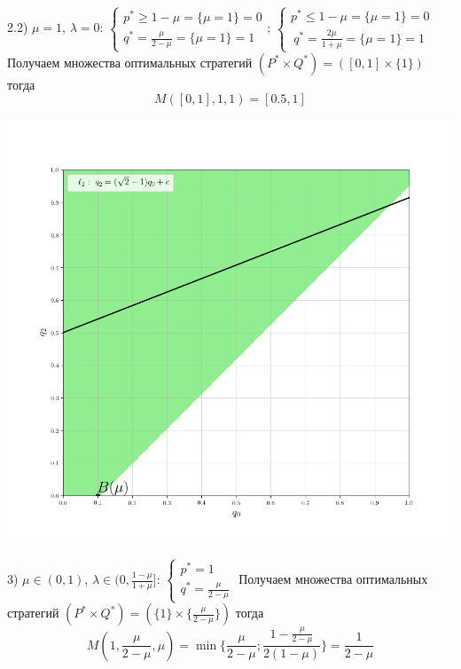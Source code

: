 \documentclass[letterpaper,12pt, reqno]{article}
\begin{document}
\begin{flushleft}
2.2) $\mu=1$, $\lambda=0$: 
$\begin{cases}p^{*} \geq 1-\mu = \{\mu=1\}=0
\\ q^{*}=\frac{\mu}{2-\mu} = \{\mu=1\}=1
\end{cases}$;
$\begin{cases}p^{*} \leq 1-\mu = \{\mu=1\}=0\\\
q^{*}=\frac{2\mu}{1+\mu}= \{\mu=1\}=1 \end{cases}$
\hfill \break 
Получаем множества оптимальных стратегий 
$(P^{*} \times Q^{*}) =([0, 1] \times \{1\})$ тогда
$$M([0, 1],1,1)=[0.5,1]$$

\begin{center}
\includegraphics[scale=0.6]{graf_3_3}
\end{center}
3) $\mu \in (0,1)$, $\lambda\in(0,\frac{1-\mu}{1+\mu}]$: 
$\begin{cases}p^{*}=1 \\ q^{*}=\frac{\mu}{2-\mu} \end{cases}$
\hfill \break
Получаем множества оптимальных стратегий 
$(P^{*} \times Q^{*}) =(\{1\} \times \{\frac{\mu}{2-\mu}\})$ тогда
$$M(1,\frac{\mu}{2-\mu},\mu)=\min \big\{\frac{\mu}{2-\mu}; 
\frac{1-\frac{\mu}{2-\mu}}{2(1-\mu)}\big\}=\frac{1}{2-\mu}$$


\end{flushleft}
\end{document}
